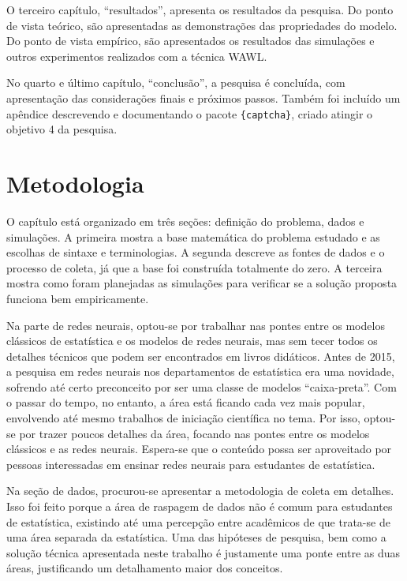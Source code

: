 \documentclass[12pt,twoside,brazilian]{book}
\begin{document}
O terceiro capítulo, ``resultados'', apresenta os resultados da
pesquisa. Do ponto de vista teórico, são apresentadas as demonstrações
das propriedades do modelo. Do ponto de vista empírico, são apresentados
os resultados das simulações e outros experimentos realizados com a
técnica WAWL.

No quarto e último capítulo, ``conclusão'', a pesquisa é concluída, com
apresentação das considerações finais e próximos passos. Também foi
incluído um apêndice descrevendo e documentando o pacote
\texttt{\{captcha\}}, criado atingir o objetivo 4 da pesquisa.


\hypertarget{sec-metodologia}{%
\chapter{Metodologia}\label{sec-metodologia}}

O capítulo está organizado em três seções: definição do problema, dados
e simulações. A primeira mostra a base matemática do problema estudado e
as escolhas de sintaxe e terminologias. A segunda descreve as fontes de
dados e o processo de coleta, já que a base foi construída totalmente do
zero. A terceira mostra como foram planejadas as simulações para
verificar se a solução proposta funciona bem empiricamente.

Na parte de redes neurais, optou-se por trabalhar nas pontes entre os
modelos clássicos de estatística e os modelos de redes neurais, mas sem
tecer todos os detalhes técnicos que podem ser encontrados em livros
didáticos. Antes de 2015, a pesquisa em redes neurais nos departamentos
de estatística era uma novidade, sofrendo até certo preconceito por ser
uma classe de modelos ``caixa-preta''. Com o passar do tempo, no
entanto, a área está ficando cada vez mais popular, envolvendo até mesmo
trabalhos de iniciação científica no tema. Por isso, optou-se por trazer
poucos detalhes da área, focando nas pontes entre os modelos clássicos e
as redes neurais. Espera-se que o conteúdo possa ser aproveitado por
pessoas interessadas em ensinar redes neurais para estudantes de
estatística.

Na seção de dados, procurou-se apresentar a metodologia de coleta em
detalhes. Isso foi feito porque a área de raspagem de dados não é comum
para estudantes de estatística, existindo até uma percepção entre
acadêmicos de que trata-se de uma área separada da estatística. Uma das
hipóteses de pesquisa, bem como a solução técnica apresentada neste
trabalho é justamente uma ponte entre as duas áreas, justificando um
detalhamento maior dos conceitos.
\end{document}
